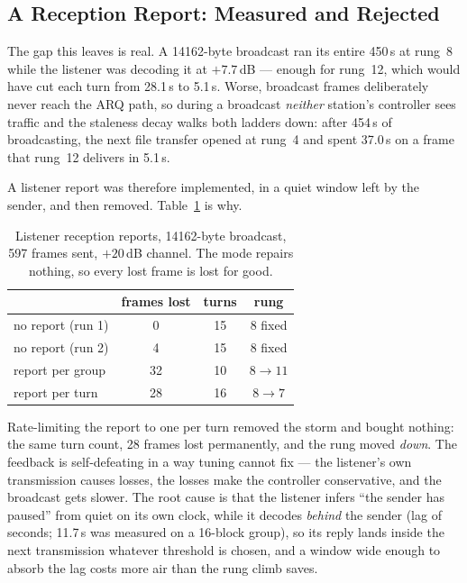 \subsection{A Reception Report: Measured and Rejected}
\label{sec:bcreport}

The gap this leaves is real.  A 14162-byte broadcast ran its entire
450\,s at rung~8 while the listener was decoding it at $+7.7$\,dB ---
enough for rung~12, which would have cut each turn from 28.1\,s to
5.1\,s.  Worse, broadcast frames deliberately never reach the ARQ
path, so during a broadcast \emph{neither} station's controller sees
traffic and the staleness decay walks both ladders down: after 454\,s
of broadcasting, the next file transfer opened at rung~4 and spent
37.0\,s on a frame that rung~12 delivers in 5.1\,s.

A listener report was therefore implemented, in a quiet window left by
the sender, and then removed.  Table~\ref{tab:bcreport} is why.

\begin{table}[H]
    \centering
    \caption{Listener reception reports, 14162-byte broadcast,
             597 frames sent, $+20$\,dB channel.  The mode repairs
             nothing, so every lost frame is lost for good.}
    \label{tab:bcreport}
    \begin{tabular}{lccc}
        \toprule
        & frames lost & turns & rung \\
        \midrule
        no report (run 1)    & 0  & 15 & 8 fixed \\
        no report (run 2)    & 4  & 15 & 8 fixed \\
        report per group     & 32 & 10 & $8\rightarrow11$ \\
        report per turn      & 28 & 16 & $8\rightarrow7$ \\
        \bottomrule
    \end{tabular}
\end{table}

Rate-limiting the report to one per turn removed the storm and bought
nothing: the same turn count, 28 frames lost permanently, and the rung
moved \emph{down}.  The feedback is self-defeating in a way tuning
cannot fix --- the listener's own transmission causes losses, the
losses make the controller conservative, and the broadcast gets slower.
The root cause is that the listener infers ``the sender has paused''
from quiet on its own clock, while it decodes \emph{behind} the sender
(lag of seconds; 11.7\,s was measured on a 16-block group), so its
reply lands inside the next transmission whatever threshold is chosen,
and a window wide enough to absorb the lag costs more air than the rung
climb saves.

